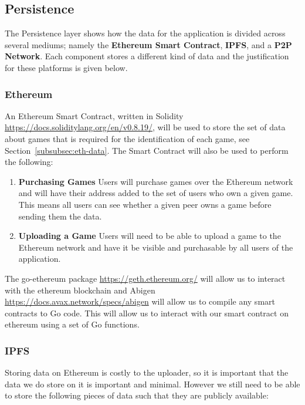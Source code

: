 
\subsection{Persistence}

The Persistence layer shows how the data for the application is divided across several mediums; namely the \textbf{Ethereum Smart Contract}, \textbf{IPFS}, and a \textbf{P2P Network}. Each component stores a different kind of data and the justification for these platforms is given below.

\subsubsection*{Ethereum}\label{subsubsec:impl-eth}

An Ethereum Smart Contract, written in Solidity \url{https://docs.soliditylang.org/en/v0.8.19/}, will be used to store the set of data about games that is required for the identification of each game, see Section~\ref{subsubsec:eth-data}. The Smart Contract will also be used to perform the following:

\begin{enumerate}
  \item \textbf{Purchasing Games} Users will purchase games over the Ethereum network and will have their address added to the set of users who own a given game. This means all users can see whether a given peer owns a game before sending them the data.
  \item \textbf{Uploading a Game} Users will need to be able to upload a game to the Ethereum network and have it be visible and purchasable by all users of the application.
\end{enumerate}

\vspace{2mm}\noindent
The go-ethereum package \url{https://geth.ethereum.org/} will allow us to interact with the ethereum blockchain and Abigen \url{https://docs.avax.network/specs/abigen} will allow us to compile any smart contracts to Go code. This will allow us to interact with our smart contract on ethereum using a set of Go functions.


\subsubsection*{IPFS}

Storing data on Ethereum is costly to the uploader, so it is important that the data we do store on it is important and minimal. However we still need to be able to store the following pieces of data such that they are publicly available:

